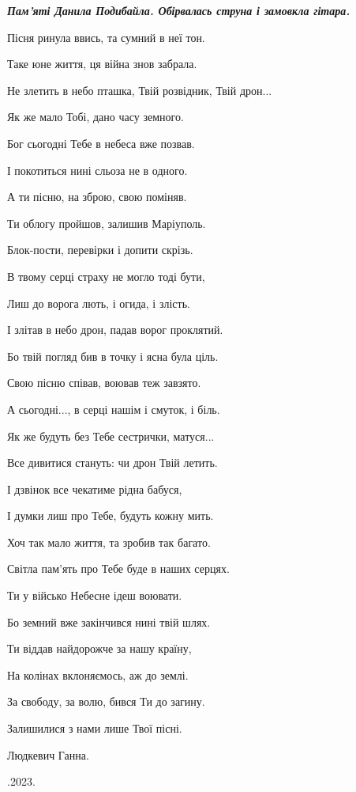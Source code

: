 \begin{center}
\Large\bfseries\em\color{blue}
Пам'яті Данила Подибайла.
\mediumskip
Обірвалась струна і замовкла гітара.\par
Пісня ринула ввись, та сумний в неї тон.\par
Таке юне життя, ця війна знов забрала.\par
Не злетить в небо пташка, Твій розвідник, Твій дрон...\par
Як же мало Тобі, дано часу земного.\par
\mediumskip
Бог сьогодні Тебе в небеса вже позвав.\par
І покотиться нині сльоза не в одного.\par
А ти пісню, на зброю, свою поміняв. \par
Ти облогу пройшов, залишив Маріуполь. \par
\mediumskip
Блок-пости, перевірки і допити скрізь.\par
В твому серці страху не могло тоді бути, \par
Лиш до ворога лють, і огида, і злість.\par
І злітав в небо дрон, падав ворог проклятий.\par
\mediumskip
Бо твій погляд бив в точку і ясна була ціль.\par
Свою пісню співав, воював теж завзято.\par
А сьогодні..., в серці нашім і смуток, і біль.\par
Як же будуть без  Тебе сестрички, матуся... \par
\mediumskip
Все дивитися стануть: чи дрон Твій летить.\par
І дзвінок все чекатиме рідна бабуся,\par
І думки лиш про Тебе, будуть кожну мить.\par
Хоч так мало життя, та зробив так багато.\par
\mediumskip
Світла пам'ять про Тебе буде в наших серцях.\par
Ти у військо Небесне ідеш воювати.\par
Бо земний вже закінчився нині твій шлях.\par
Ти віддав найдорожче за нашу країну, \par
На колінах вклоняємось, аж до землі.\par
\mediumskip
За свободу, за волю, бився Ти до загину.\par
Залишилися з нами лише Твої пісні.\par
\mediumskip
Людкевич Ганна. \par
{}.2023.
\end{center}


